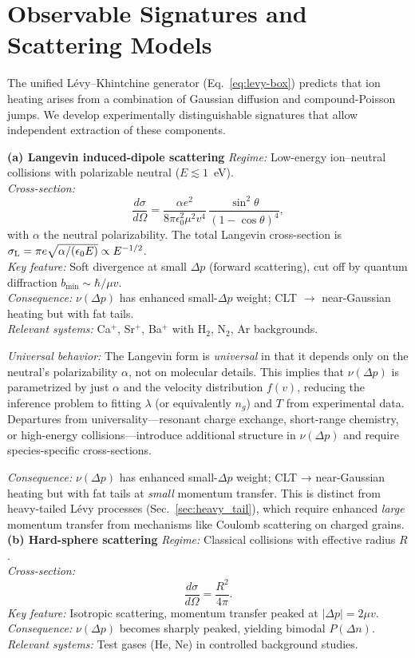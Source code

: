 \section{Observable Signatures and Scattering Models}
\label{sec:scattering-models}
\label{sec:observable_signatures}
The unified Lévy–Khintchine generator (Eq.~\ref{eq:levy-box}) predicts that ion heating arises from a combination of Gaussian diffusion and compound-Poisson jumps.
We develop experimentally distinguishable signatures that allow independent extraction of these components.

\noindent\textbf{(a) Langevin induced-dipole scattering}\quad
\emph{Regime:} Low-energy ion--neutral collisions with polarizable neutral ($E \lesssim 1$~eV).\\
\emph{Cross-section:}
\[
\frac{d\sigma}{d\Omega} =
\frac{\alpha e^2}{8\pi\epsilon_0^2 \mu^2 v^4}\,
\frac{\sin^2\theta}{(1-\cos\theta)^4},
\]
with $\alpha$ the neutral polarizability.
The total Langevin cross-section is $\sigma_{\rm L} = \pi e\sqrt{\alpha/(\epsilon_0 E)} \propto E^{-1/2}$.\\
\emph{Key feature:} Soft divergence at small $\Delta p$ (forward scattering), cut off by quantum diffraction $b_{\min}\sim \hbar/\mu v$.\\
\emph{Consequence:} $\nu(\Delta p)$ has enhanced small-$\Delta p$ weight; CLT $\to$ near-Gaussian heating but with fat tails.\\
\emph{Relevant systems:} Ca$^+$, Sr$^+$, Ba$^+$ with H$_2$, N$_2$, Ar backgrounds.

\textit{Universal behavior:}
The Langevin form is \emph{universal} in that it depends only on the neutral's polarizability $\alpha$, not on molecular details.
This implies that $\nu(\Delta p)$ is parametrized by just $\alpha$ and the velocity distribution $f(v)$, reducing the inference problem to fitting $\lambda$ (or equivalently $n_g$) and $T$ from experimental data.
Departures from universality—resonant charge exchange, short-range chemistry, or high-energy collisions—introduce additional structure in $\nu(\Delta p)$ and require species-specific cross-sections.

\textit{Consequence:} $\nu(\Delta p)$ has enhanced small-$\Delta p$ weight; CLT → near-Gaussian
heating but with fat tails at \emph{small} momentum transfer. This is distinct from heavy-tailed Lévy processes (Sec.~\ref{sec:heavy_tail}), which require enhanced \emph{large} momentum transfer from mechanisms like Coulomb scattering on charged grains.
\medskip
\noindent\textbf{(b) Hard-sphere scattering}\quad
\emph{Regime:} Classical collisions with effective radius $R$.\\
\emph{Cross-section:}
\[
\frac{d\sigma}{d\Omega} = \frac{R^2}{4\pi}.
\]
\emph{Key feature:} Isotropic scattering, momentum transfer peaked at $|\Delta p|=2\mu v$.\\
\emph{Consequence:} $\nu(\Delta p)$ becomes sharply peaked, yielding bimodal $P(\Delta n)$.\\
\emph{Relevant systems:} Test gases (He, Ne) in controlled background studies.

